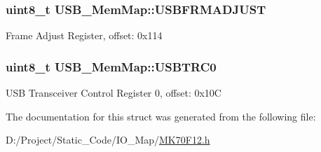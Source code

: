 \subsubsection[{U\+S\+B\+F\+R\+M\+A\+D\+J\+U\+S\+T}]{\setlength{\rightskip}{0pt plus 5cm}uint8\+\_\+t U\+S\+B\+\_\+\+Mem\+Map\+::\+U\+S\+B\+F\+R\+M\+A\+D\+J\+U\+S\+T}\label{struct_u_s_b___mem_map_a1bb1b3975dfcbbe78635e2d08b16553d}
Frame Adjust Register, offset\+: 0x114 \hypertarget{struct_u_s_b___mem_map_a10d494a848ee49ff264d62eb0bfb439e}{}
\subsubsection[{U\+S\+B\+T\+R\+C0}]{\setlength{\rightskip}{0pt plus 5cm}uint8\+\_\+t U\+S\+B\+\_\+\+Mem\+Map\+::\+U\+S\+B\+T\+R\+C0}\label{struct_u_s_b___mem_map_a10d494a848ee49ff264d62eb0bfb439e}
U\+S\+B Transceiver Control Register 0, offset\+: 0x10\+C 

The documentation for this struct was generated from the following file\+:\begin{DoxyCompactItemize}
\item 
D\+:/\+Project/\+Static\+\_\+\+Code/\+I\+O\+\_\+\+Map/\hyperlink{_m_k70_f12_8h}{M\+K70\+F12.\+h}\end{DoxyCompactItemize}
